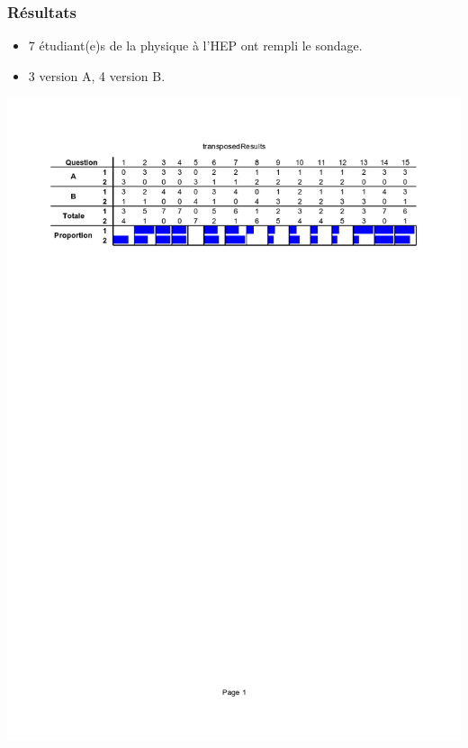 \documentclass{beamer}
\begin{document}
\begin{frame}
  \frametitle{Résultats}
  \begin{itemize}
  \item 7 étudiant(e)s de la physique à l'HEP ont rempli le sondage.
    \item 3 version A, 4 version B.
    \end{itemize}

  \begin{center}
\hspace*{-1.5cm}\includegraphics[scale=0.5]{transposedResults}%
\end{center}
  \end{frame}


\end{document}
